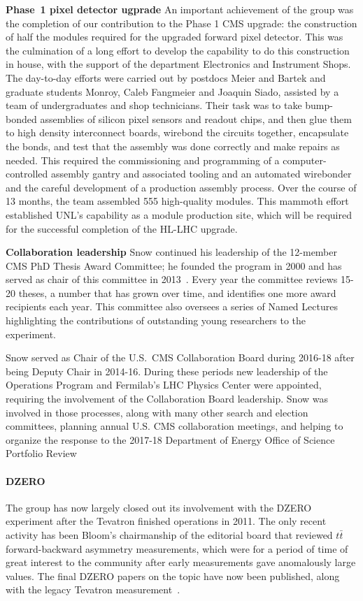 {\bf Phase~1 pixel detector ugprade}
An important achievement of the group was the completion of our contribution to the Phase 1 CMS upgrade: the construction of half the modules required for the upgraded forward pixel detector.  This was the culmination of a long effort to develop the capability to do this construction in house, with the support of the department Electronics and Instrument Shops.  The day-to-day efforts were carried out by postdocs Meier and Bartek and graduate students Monroy, Caleb Fangmeier and Joaquin Siado, assisted by a team of undergraduates and shop technicians.  Their task was to take bump-bonded assemblies of silicon pixel sensors and readout chips, and then glue them to high density interconnect boards, wirebond the circuits together, encapsulate the bonds, and test that the assembly was done correctly and make repairs as needed.  This required the commissioning and programming of a computer-controlled assembly gantry and associated tooling and an automated wirebonder and the careful development of a production assembly process.  Over the course of 13 months, the team assembled 555 high-quality modules.
This mammoth effort established UNL's capability as a module production site, which will be required for the successful completion of the HL-LHC upgrade.

{\bf Collaboration leadership}
Snow continued his leadership of the 12-member CMS PhD Thesis Award Committee; he founded the program in 2000 and has served as chair of this committee in 2013~\cite{bib:thesisawardwebsite}.  Every year the committee reviews 15-20 theses, a number that has grown over time, and identifies one more award recipients each year.  This committee also oversees a series of Named Lectures highlighting the contributions of outstanding young researchers to the experiment.

Snow served as Chair of the U.S.~CMS Collaboration Board during 2016-18 after being Deputy Chair in 2014-16.  During these periods new leadership of the Operations Program and Fermilab's LHC Physics Center were appointed, requiring the involvement of the Collaboration Board leadership.  Snow was involved in those processes, along with many other search and election committees, planning annual U.S. CMS collaboration meetings, and helping to organize the response to the 2017-18 Department of Energy Office of Science Portfolio Review~\cite{bib:portfolioreview}

\paragraph{DZERO}
The group has now largely closed out its involvement with the DZERO experiment after the Tevatron finished operations in 2011.  The only recent activity has been Bloom's chairmanship of the editorial board that reviewed $t\bar{t}$ forward-backward asymmetry measurements, which were for a period of time of great interest to the community after early measurements gave anomalously large values.  The final DZERO papers on the topic have now been published, along with the legacy Tevatron measurement~\cite{bib:D0afb}.

